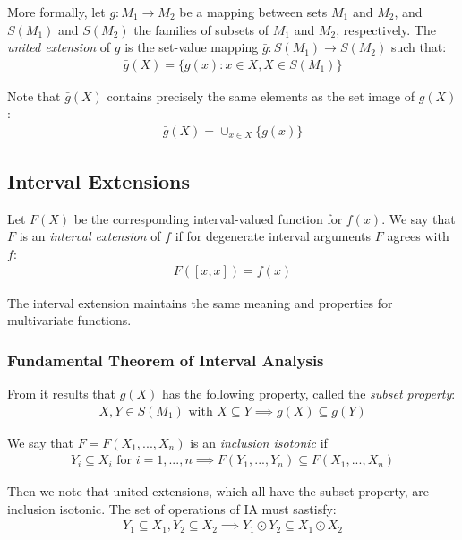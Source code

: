 \documentclass[fontsize=11pt,a4paper]{scrartcl} %
\begin{document}
More formally, let $g : M_1 \to M_2$ be a mapping between sets $M_1$ and $M_2$, and $S(M_1)$ and $S(M_2)$  the families of subsets of $M_1$ and $M_2$, respectively. The \emph{united extension} of $g$ is the set-value mapping $\bar{g} : S(M_1) \to S(M_2)$ such that:
\begin{align}
    \bar{g}(X) = \{ g(x) : x \in X, X \in S(M_1) \}\label{eq:united-extension}
\end{align}

Note that $\bar{g}(X)$ contains precisely the same elements as the set image of $g(X)$:
\begin{align}
    \bar{g}(X) = \cup_{x \in X} \{ g(x) \}
\end{align}

\subsection{Interval Extensions}

Let $F(X)$ be the corresponding interval-valued function for $f(x)$. We say that $F$ is an \emph{interval extension} of $f$ if for degenerate interval arguments $F$ agrees with $f$:
\begin{align}
    F([x,x]) = f(x)
\end{align}

The interval extension maintains the same meaning and properties for multivariate functions.

\subsubsection{Fundamental Theorem of Interval Analysis}

From  it results that $\bar{g}(X)$ has the following property, called the \emph{subset property}:
\begin{align}
    X, Y \in S(M_1) \text{ with } X \subseteq Y \implies \bar{g}(X) \subseteq \bar{g}(Y)\label{eq:subset-property}
\end{align}

We say that $F = F(X_1, ...,  X_n)$ is an \emph{inclusion isotonic} if
\begin{align}
    Y_i \subseteq X_i \text{ for } i=1,...,n \implies F(Y_1,...,Y_n) \subseteq F(X_1,...,X_n) 
\end{align}

Then we note that united extensions, which all have the subset property, are inclusion isotonic. The set of operations of IA must sastisfy:
\begin{align}
    Y_1 \subseteq X_1, Y_2 \subseteq X_2 \implies Y_1 \odot Y_2 \subseteq X_1 \odot X_2
\end{align}
\end{document}
